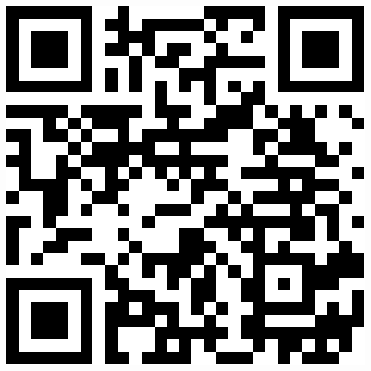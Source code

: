 \documentclass[12pt]{extarticle}
\begin{document}
% 
% 
% 

\vfill

\begin{flushright}
 \href{https://sites.google.com/view/edisonflorez/home}{\includegraphics[scale=0.15]{img/qr_google_sites.pdf}}
\end{flushright}
\end{document}

